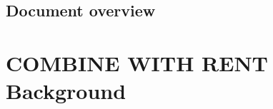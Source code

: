 \section{Document overview}





\chapter{COMBINE WITH RENT Background} \label{chapter-background}


